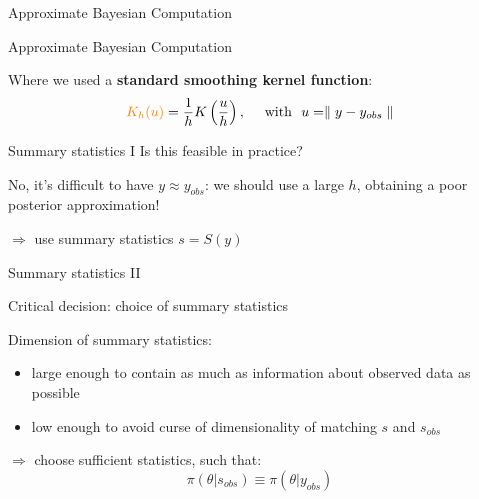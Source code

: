 \documentclass{beamer}
\begin{document}
\begin{section}{Approximate Bayesian Computation}
	\begin{frame}{Approximate Bayesian Computation}

	

		\pause
		\vspace{0.7cm}
		Where we used a \textbf{standard smoothing kernel function}:
		\[ \textcolor{orange}{K_h(u)}  =  \frac{1}{h}  K \left( \frac{u}{h} \right), \quad \text{ with } \  u=\parallel y-y_{obs} \parallel \]
		
		
	\end{frame}

	\begin{frame}{Summary statistics I}
		Is this feasible in practice?
		
		\pause
		\vspace{0.3cm}
		No, it's difficult to have $y\approx y_{obs}$: we should use a large $h$, obtaining a poor posterior approximation!
		
		\vspace{0.3cm}
		$\Longrightarrow$ use summary statistics $s = S(y)$
	\end{frame}
		
	\begin{frame}{Summary statistics II}
		
		Critical decision: choice of summary statistics\\
		\pause
		
		\vspace{0.3cm}
		Dimension of summary statistics:
		\begin{itemize}
			\item large enough to contain as much as information about observed data as possible
			\item low enough to avoid curse of dimensionality of matching $s$ and $s_{obs}$
		\end{itemize}
		
		\vspace{0.3cm}
		$\Longrightarrow$ choose sufficient statistics, such that:
		\[   \pi(\theta|s_{obs}) \equiv \pi(\theta|y_{obs})   \]


\end{frame}
\end{section}
\end{document}
